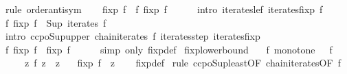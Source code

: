 \begin{isabellebody}
%
\isadelimproof
%
\endisadelimproof
%
\isatagproof
{}\isamarkupfalse%
\ {\isacharparenleft}{\kern0pt}rule\ order{\isachardot}{\kern0pt}antisym{\isacharparenright}{\kern0pt}\isanewline
\ \ \isamarkupfalse%
\ {\isachardoublequoteopen}fixp\ f\ {\isasymle}\ f\ {\isacharparenleft}{\kern0pt}fixp\ f{\isacharparenright}{\kern0pt}{\isachardoublequoteclose}\isanewline
\ \ \ \ \isamarkupfalse%
\ {\isacharparenleft}{\kern0pt}intro\ iterates{\isacharunderscore}{\kern0pt}le{\isacharunderscore}{\kern0pt}f\ iterates{\isacharunderscore}{\kern0pt}fixp\ f{\isacharparenright}{\kern0pt}\isanewline
\ \ \isamarkupfalse%
\ {\isachardoublequoteopen}f\ {\isacharparenleft}{\kern0pt}fixp\ f{\isacharparenright}{\kern0pt}\ {\isasymle}\ Sup\ {\isacharparenleft}{\kern0pt}iterates\ f{\isacharparenright}{\kern0pt}{\isachardoublequoteclose}\isanewline
\ \ \ \ \isamarkupfalse%
\ {\isacharparenleft}{\kern0pt}intro\ ccpo{\isacharunderscore}{\kern0pt}Sup{\isacharunderscore}{\kern0pt}upper\ chain{\isacharunderscore}{\kern0pt}iterates\ f\ iterates{\isachardot}{\kern0pt}step\ iterates{\isacharunderscore}{\kern0pt}fixp{\isacharparenright}{\kern0pt}\isanewline
\ \ \isamarkupfalse%
\ \isamarkupfalse%
\ {\isachardoublequoteopen}f\ {\isacharparenleft}{\kern0pt}fixp\ f{\isacharparenright}{\kern0pt}\ {\isasymle}\ fixp\ f{\isachardoublequoteclose}\isanewline
\ \ \ \ \isamarkupfalse%
\ {\isacharparenleft}{\kern0pt}simp\ only{\isacharcolon}{\kern0pt}\ fixp{\isacharunderscore}{\kern0pt}def{\isacharparenright}{\kern0pt}\isanewline
{}\isamarkupfalse%
%
\endisatagproof
{\isafoldproof}%
%
\isadelimproof
\isanewline
%
\endisadelimproof
\isanewline
{}\isamarkupfalse%
\ fixp{\isacharunderscore}{\kern0pt}lowerbound{\isacharcolon}{\kern0pt}\isanewline
\ \ \ f{\isacharcolon}{\kern0pt}\ {\isachardoublequoteopen}monotone\ {\isacharparenleft}{\kern0pt}{\isasymle}{\isacharparenright}{\kern0pt}\ {\isacharparenleft}{\kern0pt}{\isasymle}{\isacharparenright}{\kern0pt}\ f{\isachardoublequoteclose}\isanewline
\ \ \ \ \ z{\isacharcolon}{\kern0pt}\ {\isachardoublequoteopen}f\ z\ {\isasymle}\ z{\isachardoublequoteclose}\isanewline
\ \ \ {\isachardoublequoteopen}fixp\ f\ {\isasymle}\ z{\isachardoublequoteclose}\isanewline
%
\isadelimproof
\ \ %
\endisadelimproof
%
\isatagproof
{}\isamarkupfalse%
\ fixp{\isacharunderscore}{\kern0pt}def\isanewline
{}\isamarkupfalse%
\ {\isacharparenleft}{\kern0pt}rule\ ccpo{\isacharunderscore}{\kern0pt}Sup{\isacharunderscore}{\kern0pt}least{\isacharbrackleft}{\kern0pt}OF\ chain{\isacharunderscore}{\kern0pt}iterates{\isacharbrackleft}{\kern0pt}OF\ f{\isacharbrackright}{\kern0pt}{\isacharbrackright}{\kern0pt}{\isacharparenright}{\kern0pt}\isanewline

\end{isabellebody}
